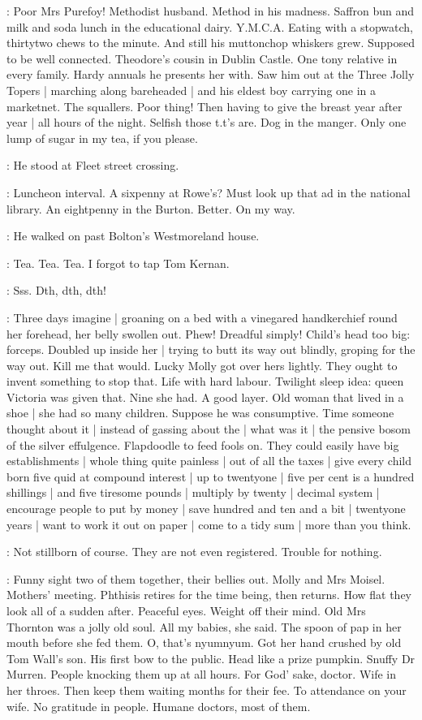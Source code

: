 \BloomInt:
Poor Mrs Purefoy!
Methodist husband.
Method in his madness.
Saffron bun and milk and soda lunch in the educational dairy.
Y.M.C.A.
Eating with a stopwatch,
thirtytwo chews to the minute.
And still his muttonchop whiskers grew.
Supposed to be well connected.
Theodore's cousin in Dublin Castle.
One tony relative in every family.
Hardy annuals he presents her with.
Saw him out at the Three Jolly Topers |
marching along bareheaded |
and his eldest boy carrying one in a marketnet.
The squallers.
Poor thing!
Then having to give the breast year after year |
all hours of the night.
Selfish those t.t's are.
Dog in the manger.
Only one lump of sugar in my tea,
if you please.

:
He stood at Fleet street crossing.

\BloomInt:
Luncheon interval.
A sixpenny at Rowe's?
Must look up that ad in the national library.
An eightpenny in the Burton.
Better.
On my way.

:
He walked on past Bolton's Westmoreland house.

\BloomInt:
Tea.
Tea.
Tea.
I forgot to tap Tom Kernan.

\Bloom:
Sss.
Dth, dth, dth!

\BloomInt:
Three days imagine |
groaning on a bed with a vinegared handkerchief round her forehead,
her belly swollen out.
Phew!
Dreadful simply!
Child's head too big:
forceps.
Doubled up inside her |
trying to butt its way out blindly,
groping for the way out.
Kill me that would.
Lucky Molly got over hers lightly.
They ought to invent something to stop that.
Life with hard labour.
Twilight sleep idea:
queen Victoria
was given that.
Nine she had.
A good layer.
Old woman that lived in a shoe |
she had so many children.
Suppose he was consumptive.
Time someone thought about it |
instead of gassing about the |
what was it |
the pensive bosom of the silver effulgence.
Flapdoodle to feed fools on.
They could easily have big establishments |
whole thing quite painless |
out of all the taxes |
give every child born five quid at compound interest |
up to twentyone |
five per cent is a hundred shillings |
and five tiresome pounds |
multiply by twenty |
decimal system |
encourage people to put by money |
save hundred and ten and a bit |
twentyone years |
want to work it out on paper |
come to a tidy sum |
more than you think.

\BloomInt:
Not stillborn of course.
They are not even registered.
Trouble for nothing.%

\BloomInt:
Funny sight two of them together,
their bellies out.
Molly and Mrs Moisel.
Mothers' meeting.
Phthisis retires for the time being,
then returns.
How flat they look all of a sudden after.
Peaceful eyes.
Weight off their mind.
Old Mrs Thornton was a jolly old soul.
All my babies,
she said.
The spoon of pap in her mouth before she fed them.
O, that's nyumnyum.
Got her hand crushed by old Tom Wall's son.
His first bow to the public.
Head like a prize pumpkin.
Snuffy Dr Murren.
People knocking them up at all hours.
For God' sake, doctor.
Wife in her throes.
Then keep them waiting months for their fee.
To attendance on your wife.
No gratitude in people.
Humane doctors,
most of them.


